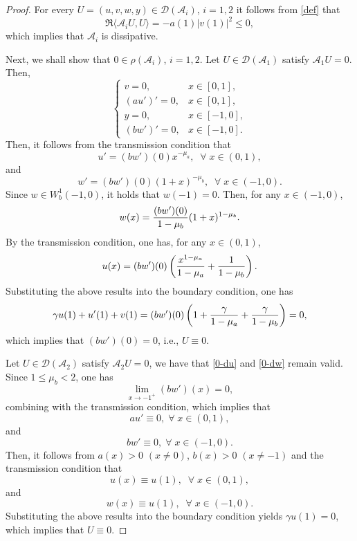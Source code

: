 \documentclass[10pt,a4paper]{amsart}
\begin{document}
\begin{proof}
For every $U=(u,v,w,y)\in\mathcal D(\mathcal A_i)$, $i=1,2$ it follows from \eqref{def} that
$$\Re \langle \mathcal A_iU,U \rangle = - a(1)\left|v(1)\right|^2 \leq 0,$$
which implies that $\mathcal A_i$ is dissipative.

Next, we shall show that $0\in\rho(\mathcal A_i)$, $i=1,2$. Let $U\in\mathcal D(\mathcal A_1)$ satisfy $\mathcal A_1 U = 0$.  Then,
\begin{equation}
	\begin{cases}
		v=0, &x\in[0,1],\\
		(au')' = 0,&x\in[0,1],\\
		y = 0,&x\in[-1,0],\\
		(bw')' =0,&x\in[-1,0].
	\end{cases}
\end{equation}
Then, it follows from the transmission condition that
\begin{equation}\label{0-du}
	u' = (bw')(0)x^{-\mu_a},\;\;\forall\;x\in(0,1),
\end{equation}
and
\begin{equation}\label{0-dw}
	w' = (bw')(0)(1+x)^{-\mu_b},\;\;\forall\;x\in(-1,0).
\end{equation}
Since $w\in W_b^1(-1,0)$, it holds that $w(-1) = 0$. Then, for any $x\in(-1,0)$,
$$ w(x)= {(bw')(0)\over1-\mu_b}(1+x)^{1-\mu_b}. $$
By the transmission condition, one has, for any $x\in(0,1)$,
\begin{equation}
	\begin{split}
		u(x) =(bw')(0)\left({x^{1-\mu_a}\over 1-\mu_a} + {1\over1-\mu_b}\right).
	\end{split}
\end{equation}
Substituting the above results into the boundary condition, one has
$$\gamma u(1)+u'(1)+v(1) = (bw')(0) \left(1 + {\gamma\over1-\mu_a} +{\gamma\over1-\mu_b}\right) = 0,$$
which implies that $(bw')(0) = 0$, i.e., $U\equiv0$.

Let $U\in\mathcal D(\mathcal A_2)$ satisfy $\mathcal A_2U=0$, we have that \eqref{0-du} and \eqref{0-dw} remain valid. Since $1\leq\mu_b<2$, one has
\begin{equation*}
	\lim_{x\rightarrow -1^+} (bw')(x) = 0,
\end{equation*}
combining with the transmission condition, which implies that
$$au'\equiv 0,\;\forall\; x\in(0,1),$$and
$$bw'\equiv 0,\;\forall\; x\in(-1,0).$$
Then, it follows from $a(x)>0$ $(x\neq0)$, $b(x)>0$ $(x\neq-1)$ and the transmission condition that
$$u(x)\equiv u(1),\;\;\forall\;x\in(0,1),$$
and $$ w(x) \equiv u(1),\;\;\forall\; x\in(-1,0).$$
Substituting the above results into the boundary condition yields
$\gamma u(1) = 0$,
which implies that $U\equiv 0$.


\end{proof}
\end{document}
